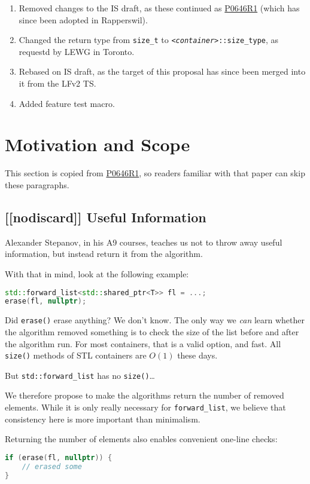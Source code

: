 \documentclass[11pt]{article}
\newcommand{\wgpaper}[1]{\href{https://wg21.link/#1}{#1}}
\newcommand{\cst}{\texttt{\textit{<container>}::size\_type}}
\begin{document}
\begin{enumerate}
\item Removed changes to the IS draft, as these continued as
  \wgpaper{P0646R1} (which has since been adopted in Rapperswil).
\item Changed the return type from \texttt{size\_t} to
  \cst, as requestd by LEWG in Toronto.
\item Rebased on IS draft, as the target of this proposal has since
  been merged into it from the LFv2 TS.
\item Added feature test macro.
\end{enumerate}

\section{Motivation and Scope}

This section is copied from \wgpaper{P0646R1}, so readers familiar
with that paper can skip these paragraphs.

\subsection{[[nodiscard]] Useful Information}

Alexander Stepanov, in his A9 courses\cite{A9}, teaches us not to
throw away useful information, but instead return it from the
algorithm.

With that in mind, look at the following example:
\begin{lstlisting}[language=C++]
std::forward_list<std::shared_ptr<T>> fl = ...;
erase(fl, nullptr);
\end{lstlisting}
Did \texttt{erase()} erase anything? We don't know. The only way we
\emph{can} learn whether the algorithm removed something is to check
the size of the list before and after the algorithm run. For most
containers, that is a valid option, and fast. All \texttt{size()}
methods of STL containers are $O(1)$ these days.

But \texttt{std::forward\_list} has no \texttt{size()}\ldots

We therefore propose to make the algorithms return the number of
removed elements. While it is only really necessary for
\texttt{forward\_list}, we believe that consistency here is more
important than minimalism.

Returning the number of elements also enables convenient one-line
checks:
\begin{lstlisting}[language=C++]
if (erase(fl, nullptr)) {
    // erased some
}
\end{lstlisting}
\end{document}

